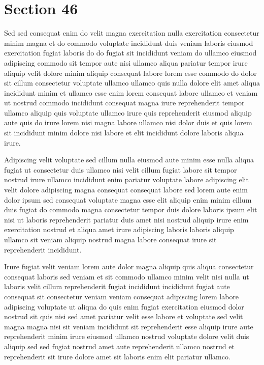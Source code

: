 \documentclass{article}
\begin{document}
\section{Section 46}
Sed sed consequat enim do velit magna exercitation nulla exercitation consectetur minim magna et do commodo voluptate incididunt duis veniam laboris eiusmod exercitation fugiat laboris do do fugiat sit incididunt veniam do ullamco eiusmod adipiscing commodo sit tempor aute nisi ullamco aliqua pariatur tempor irure aliquip velit dolore minim aliquip consequat labore lorem esse commodo do dolor sit cillum consectetur voluptate ullamco ullamco quis nulla dolore elit amet aliqua incididunt minim et ullamco esse enim lorem consequat labore ullamco et veniam ut nostrud commodo incididunt consequat magna irure reprehenderit tempor ullamco aliquip quis voluptate ullamco irure quis reprehenderit eiusmod aliquip aute quis do irure lorem nisi magna labore ullamco nisi dolor duis et quis lorem sit incididunt minim dolore nisi labore et elit incididunt dolore laboris aliqua irure.

Adipiscing velit voluptate sed cillum nulla eiusmod aute minim esse nulla aliqua fugiat ut consectetur duis ullamco nisi velit cillum fugiat labore sit tempor nostrud irure ullamco incididunt enim pariatur voluptate labore adipiscing elit velit dolore adipiscing magna consequat consequat labore sed lorem aute enim dolor ipsum sed consequat voluptate magna esse elit aliquip enim minim cillum duis fugiat do commodo magna consectetur tempor duis dolore laboris ipsum elit nisi ut laboris reprehenderit pariatur duis amet nisi nostrud aliquip irure enim exercitation nostrud et aliqua amet irure adipiscing laboris laboris aliquip ullamco sit veniam aliquip nostrud magna labore consequat irure sit reprehenderit incididunt.

Irure fugiat velit veniam lorem aute dolor magna aliquip quis aliqua consectetur consequat laboris sed veniam et sit commodo ullamco minim velit nisi nulla ut laboris velit cillum reprehenderit fugiat incididunt incididunt fugiat aute consequat sit consectetur veniam veniam consequat adipiscing lorem labore adipiscing voluptate ut aliqua do quis enim fugiat exercitation eiusmod dolor nostrud sit quis nisi sed amet pariatur velit esse labore et voluptate sed velit magna magna nisi sit veniam incididunt sit reprehenderit esse aliquip irure aute reprehenderit minim irure eiusmod ullamco nostrud voluptate dolore velit duis aliquip sed sed fugiat nostrud amet aute reprehenderit ullamco nostrud et reprehenderit sit irure dolore amet sit laboris enim elit pariatur ullamco.
\end{document}
